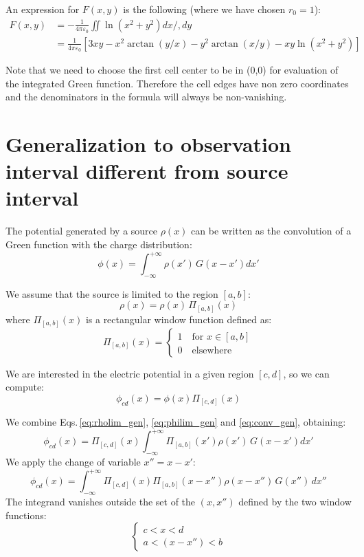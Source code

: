 An expression for $F(x,y)$ is the following (where we have chosen $r_0=1$):
\begin{align}
F(x,y) &=-\frac{1}{4\pi\varepsilon_0}\iint \ln \left(x^{2}+y^{2}\right) dx/,dy\\
&=\frac{1}{4\pi\varepsilon_0}\left[3 x y-x^{2} \arctan (y / x)-y^{2} \arctan (x / y)-x y \ln \left(x^{2}+y^{2}\right)\right]
\end{align}

Note that we need to choose the first cell center to be in (0,0) for evaluation of the integrated Green function. Therefore the cell edges have non zero coordinates and the denominators in the formula will always be non-vanishing.

\section{Generalization to observation interval different from source interval}
The potential generated by a source $\rho(x)$ can be written as the convolution of a Green function with the charge distribution:
\begin{equation}
\phi(x) = \int_{-\infty}^{+\infty} \rho(x')\,G(x-x') dx'
\label{eq:conv_gen}
\end{equation}

We assume that the source is limited to the region  $[a, b]$:
\begin{equation}
\rho(x) = \rho(x)\,\Pi_{[a,b]}\left(x\right)
\label{eq:rholim_gen}
\end{equation}
where $\Pi_{[a,b]}(x)$ is a rectangular window function defined as:
\begin{equation}
\Pi_{[a,b]}(x) = 
\begin{cases}
1\quad\text{for } x \in [a, b]\\
0\quad\text{elsewhere}
\end{cases}
\end{equation}

We are interested in the electric potential in a given region $[c, d]$, so we can compute:
\begin{equation}
\phi_{cd}(x) = \phi(x) \Pi_{[c, d]}\left(x\right)
\label{eq:philim_gen}
\end{equation}

We combine Eqs.\,\eqref{eq:rholim_gen}, \eqref{eq:philim_gen} and \eqref{eq:conv_gen}, obtaining:
\begin{equation}
\phi_{cd}(x) = \Pi_{[c,d]}\left( x\right)
\int_{-\infty}^{+\infty} 
\Pi_{[a,b]}\left(x'\right)
\rho(x')\,G(x-x') dx'
\end{equation}
We apply the change of variable $x'' = x - x'$:
\begin{equation}
\phi_{cd}(x) = 
\int_{-\infty}^{+\infty} 
\Pi_{[c,d]}\left({x}\right)
\Pi_{[a,b]}\left({x-x''}\right)
\rho(x-x'')\,G(x'') \,dx''
\label{eq:conv1_gen}
\end{equation}
The integrand vanishes outside the set of the $(x, x'')$ defined by the two window functions:
\begin{equation}
\begin{cases}
c < x <d\\
a < (x-x'') <b
\end{cases}
\end{equation}

